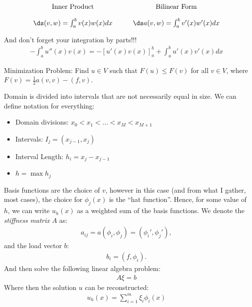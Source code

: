 \documentclass{article}
\begin{document}
\[
\begin{array}{c@{\hspace{3em}}c}
    \text{Inner Product} & \text{Bilinear Form} \\[1em]
    \ds (v, w) = \int_{a}^{b}v(x)w(x)dx & \ds a(v, w) = \int_{a}^{b}v'(x)w'(x)dx
\end{array}
\]

And don't forget your integration by parts!!!
\begin{align*}
  -\int_{a}^{b}u''(x)v(x) = - \left[u'(x)v(x)\right]^b_a + \int_{a}^{b}u'(x)v'(x)dx
\end{align*}

 Minimization Problem: Find $u \in V$ such that $F(u) \leq F(v)$ for all $v \in V$, where $F(v) = \frac{1}{2} a(v, v) - (f, v)$.
\gap

 Domain is divided into intervals that are not necessarily equal in size.
We can define notation for everything:
\begin{itemize}
\item Domain divisions: $x_0 < x_1 < \ldots < x_M < x_{M+1}$
\item Intervals: $I_j = (x_{j-1}, x_j)$
\item Interval Length: $h_i = x_j - x_{j-1}$
\item $h = \max{h_j}$
\end{itemize}
 Basis functions are the choice of $v$, however in this case
(and from what I gather, most cases), the choice for $\phi_j(x)$ is the ``hat function''.
Hence, for some value of $h$, we can write $u_h(x)$ as a weighted sum of the basis functions.
\gap
We denote the \textit{stiffness matrix} $A$ as:
\begin{align*}
  a_{ij} = a(\phi_i, \phi_j) = (\phi_i', \phi_j'),
\end{align*}
and the load vector $b$:
\begin{align*}
  b_i = (f, \phi_i).
\end{align*}
And then solve the following linear algebra problem:
\begin{align*}
  A \xi = b
\end{align*}
Where then the solution $u$ can be reconstructed:
\begin{align*}
  u_h(x) = \sum_{i=1}^{m}\xi_i \phi_i (x)
\end{align*}
\end{document}
